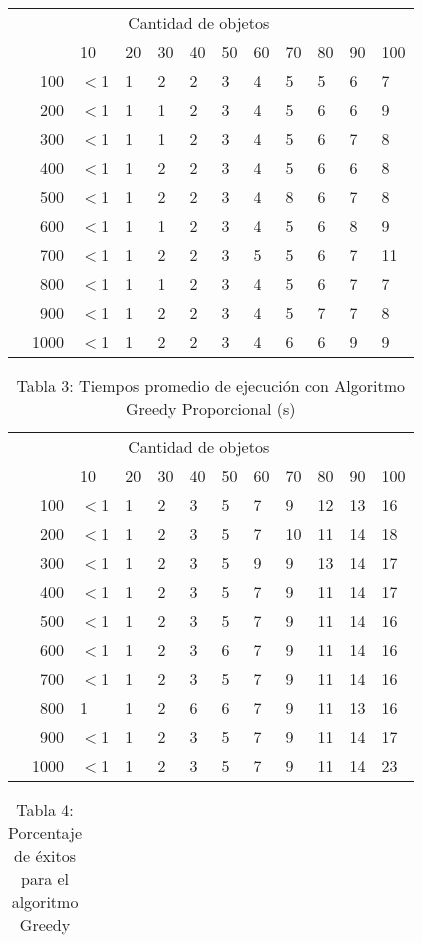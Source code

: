 \documentclass{article}
\begin{document}
\begin{center}
\begin{table}[ht]
\begin{tabularx}{0.8\textwidth}{Xr|XXXXXXXXXX}
&\multicolumn{10}{c}{Cantidad de objetos} \\
&&10&20&30&40&50&60&70&80&90&100\\\hline
\parbox[t]{2mm}{}&100&$<$1&1&2&2&3&4&5&5&6&7\\
&200&$<$1&1&1&2&3&4&5&6&6&9\\
&300&$<$1&1&1&2&3&4&5&6&7&8\\
&400&$<$1&1&2&2&3&4&5&6&6&8\\
&500&$<$1&1&2&2&3&4&8&6&7&8\\
&600&$<$1&1&1&2&3&4&5&6&8&9\\
&700&$<$1&1&2&2&3&5&5&6&7&11\\
&800&$<$1&1&1&2&3&4&5&6&7&7\\
&900&$<$1&1&2&2&3&4&5&7&7&8\\
&1000&$<$1&1&2&2&3&4&6&6&9&9\\
\end{tabularx}
\end{table}
\begin{table}[ht]
\centering
\caption*{Tabla 3: Tiempos promedio de ejecución con Algoritmo Greedy Proporcional (\textmu s)}
\label{3}
\begin{tabularx}{0.8\textwidth}{Xr|XXXXXXXXXX}
&\multicolumn{10}{c}{Cantidad de objetos} \\
&&10&20&30&40&50&60&70&80&90&100\\\hline
\parbox[t]{2mm}{}&100&$<$1&1&2&3&5&7&9&12&13&16\\
&200&$<$1&1&2&3&5&7&10&11&14&18\\
&300&$<$1&1&2&3&5&9&9&13&14&17\\
&400&$<$1&1&2&3&5&7&9&11&14&17\\
&500&$<$1&1&2&3&5&7&9&11&14&16\\
&600&$<$1&1&2&3&6&7&9&11&14&16\\
&700&$<$1&1&2&3&5&7&9&11&14&16\\
&800&1&1&2&6&6&7&9&11&13&16\\
&900&$<$1&1&2&3&5&7&9&11&14&17\\
&1000&$<$1&1&2&3&5&7&9&11&14&23\\
\end{tabularx}
\end{table}
\begin{table}[ht]
\centering
\caption*{Tabla 4: Porcentaje de éxitos para el algoritmo Greedy}
\label{4}
\begin{tabularx}{0.8\textwidth}{Xr|XXXXXXXXXX}

\end{tabularx}
\end{table}
\end{center}
\end{document}
